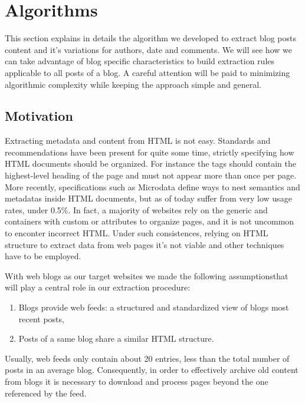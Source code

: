\section{Algorithms}

This section explains in details the algorithm we developed to extract blog posts content and it's variations for authors, date and comments. We will see how we can take advantage of blog specific characteristics to build extraction rules applicable to all posts of a blog. A careful attention will be paid to minimizing algorithmic complexity while keeping the approach simple and general.


\subsection{Motivation}
%
Extracting metadata and content from HTML is not easy. Standards and recommendations have been present for quite some time, strictly specifying how HTML documents should be organized. For instance the  tags should contain the highest-level heading of the page and must not appear more than once per page\cite{w3c2002}. More recently, specifications such as Microdata\cite{whatwg2013} define ways to nest semantics and metadatas inside HTML documents, but as of today suffer from very low usage rates, under 0.5\%\cite{andrewrogers2013}. In fact, a majority of websites rely on the generic  and  containers with custom  or  attributes to organize pages, and it is not uncommon to enconter incorrect HTML. Under such consistences, relying on HTML structure to extract data from web pages it's not viable and other techniques have to be employed.


%
With web blogs as our target websites we made the following assumptionsthat will play a central role in our extraction procedure:
\begin{enumerate}[label={(\arabic*)}]
  \item\label{havefeedAssum} Blogs provide web feeds: a structured and standardized view of blogs most recent posts,
  \item\label{similarhtmlAssum} Posts of a same blog share a similar HTML structure.
\end{enumerate}
Usually, web feeds only contain about 20 entries\cite{oita2010}, less than the total number of posts in an average blog. Consequently, in order to effectively archive old content from blogs it is necessary to download and process pages beyond the one referenced by the feed.


